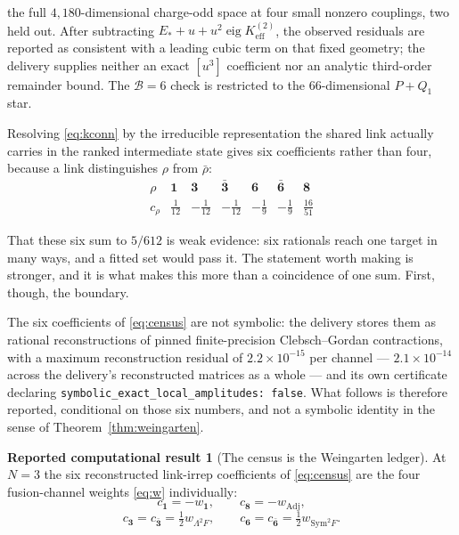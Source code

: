 \documentclass[11pt]{article}
\theoremstyle{plain}
\theoremstyle{definition}
\newtheorem{reported}[theorem]{Reported computational result}
\theoremstyle{remark}
\newcommand{\chk}[1]{}
\begin{document}
the full $4{,}180$-dimensional charge-odd space at four small nonzero
couplings, two held out. After subtracting
$E_*+u+u^2\operatorname{eig}K_{\mathrm{eff}}^{(2)}$, the observed residuals
are reported as consistent with a leading cubic term on that fixed geometry;
the delivery supplies neither an exact $[u^3]$ coefficient nor an analytic
third-order remainder bound. The $\mathcal B=6$ check is restricted to the
$66$-dimensional $P+Q_1$ star.
\chk{the connected two-cube geometry has exactly four cross-cell pairs, each -1}
\chk{the B=6 connected kernel is (5/612) G\_conn + diag, with the certified spectrum}
\chk{the certificate's own gates pass, target-blind, with the wrong-sign control rejected}

Resolving \eqref{eq:kconn} by the irreducible representation the shared link
actually carries in the ranked intermediate state gives six coefficients rather
than four, because a link distinguishes $\rho$ from $\bar\rho$:
\begin{equation}\label{eq:census}
\begin{array}{c|cccccc}
 \rho & \mathbf1 & \mathbf3 & \bar{\mathbf3} & \mathbf6 & \bar{\mathbf6} & \mathbf8\\
 \hline
 c_\rho & \tfrac1{12} & -\tfrac1{12} & -\tfrac1{12}
        & -\tfrac19 & -\tfrac19 & \tfrac{16}{51}
\end{array}
\end{equation}
\chk{the B=6 six-channel census sums to the registry's own t\_3 = 5/612}

That these six sum to $5/612$ is weak evidence: six rationals reach one target
in many ways, and a fitted set would pass it. The statement worth making is
stronger, and it is what makes this more than a coincidence of one sum. First,
though, the boundary.

The six coefficients of \eqref{eq:census} are not symbolic: the delivery
stores them as rational reconstructions of pinned finite-precision
Clebsch--Gordan contractions, with a maximum reconstruction residual of
$2.2\times10^{-15}$ per channel --- $2.1\times10^{-14}$ across the delivery's
reconstructed matrices as a whole --- and its own certificate declaring
\texttt{symbolic\_exact\_local\_amplitudes: false}. What follows is therefore
reported, conditional on those six numbers, and not a symbolic identity in the
sense of Theorem~\ref{thm:weingarten}.

\begin{reported}[The census is the Weingarten ledger]\label{rep:census}
At $N=3$ the six reconstructed link-irrep coefficients of \eqref{eq:census}
are the four fusion-channel weights \eqref{eq:w} individually:
\[
  c_{\mathbf 1}=-w_{\mathbf 1},\qquad
  c_{\mathbf 8}=-w_{\mathrm{Adj}},
\]
\[
  c_{\mathbf 3}=c_{\bar{\mathbf 3}}=\tfrac12 w_{\Lambda^2F},\qquad
  c_{\mathbf 6}=c_{\bar{\mathbf 6}}=\tfrac12 w_{\mathrm{Sym}^2F}.
\]
\end{reported}
\end{document}
